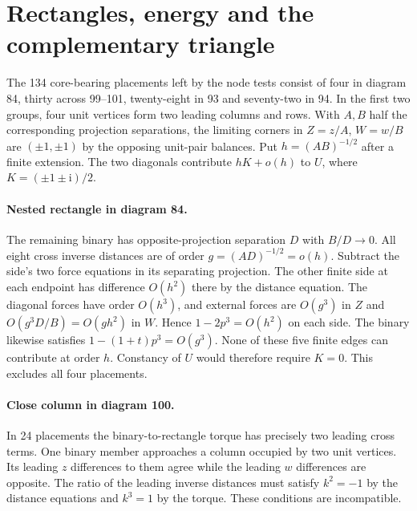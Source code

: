 \documentclass[11pt]{article}
\begin{document}
\section{Rectangles, energy and the complementary triangle}
The 134 core-bearing placements left by the node tests consist of four in diagram 84, thirty across 99--101, twenty-eight in 93 and seventy-two in 94. In the first two groups, four unit vertices form two leading columns and rows. With $A,B$ half the corresponding projection separations, the limiting corners in $Z=z/A$, $W=w/B$ are $(\pm1,\pm1)$ by the opposing unit-pair balances. Put $h=(AB)^{-1/2}$ after a finite extension. The two diagonals contribute $hK+o(h)$ to $U$, where $K=(\pm1\pm\mathrm{i})/2$.

\paragraph{Nested rectangle in diagram 84.}
The remaining binary has opposite-projection separation $D$ with $B/D\to0$. All eight cross inverse distances are of order $g=(AD)^{-1/2}=o(h)$. Subtract the side's two force equations in its separating projection. The other finite side at each endpoint has difference $O(h^2)$ there by the distance equation. The diagonal forces have order $O(h^3)$, and external forces are $O(g^3)$ in $Z$ and $O(g^3D/B)=O(gh^2)$ in $W$. Hence $1-2p^3=O(h^2)$ on each side. The binary likewise satisfies $1-(1+t)p^3=O(g^3)$. None of these five finite edges can contribute at order $h$. Constancy of $U$ would therefore require $K=0$. This excludes all four placements.

\paragraph{Close column in diagram 100.}
In 24 placements the binary-to-rectangle torque has precisely two leading cross terms. One binary member approaches a column occupied by two unit vertices. Its leading $z$ differences to them agree while the leading $w$ differences are opposite. The ratio of the leading inverse distances must satisfy $k^2=-1$ by the distance equations and $k^3=1$ by the torque. These conditions are incompatible.

\newpage
\end{document}
